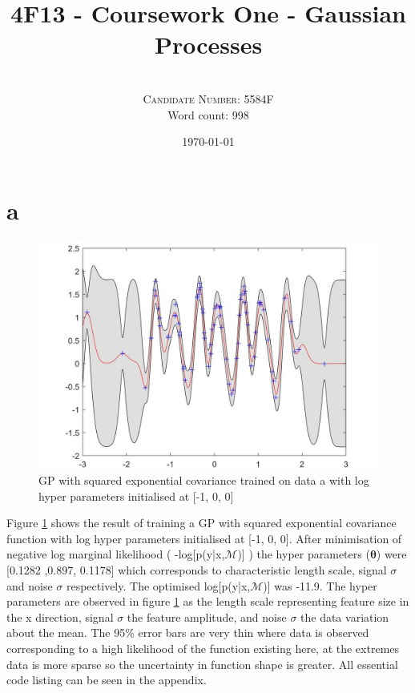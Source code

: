 \documentclass[twoside,twocolumn]{article}
\title{4F13 - Coursework One - Gaussian Processes } %
\author{%
\\
\textsc{Candidate Number: 5584F} \\
\normalsize Word count: 998 \\
}
\date{\today} %
\begin{document}
\onecolumn

\twocolumn
\maketitle



\section{a}
\begin{figure}[h]
  \centering
    \includegraphics[width=\linewidth]{c_1_1}
  \caption{GP with squared exponential covariance trained on data a with log hyper parameters initialised at [-1, 0, 0]}
  \label{fig:c_1}
\end{figure}
Figure \ref{fig:c_1} shows the result of training a GP with squared exponential covariance function with log hyper parameters initialised at [-1, 0, 0]. After minimisation of negative log marginal likelihood ( -log[p(y|x,$\mathcal{M}$)] ) the hyper parameters ($\boldsymbol{\theta}$) were [0.1282 ,0.897, 0.1178] which corresponds to characteristic length scale, signal $\sigma$ and noise $\sigma$ respectively. The optimised log[p(y|x,$\mathcal{M}$)] was -11.9. The hyper parameters are observed in figure \ref{fig:c_1} as the length scale representing feature size in the x direction, signal $\sigma$ the feature amplitude, and noise $\sigma$ the data variation about the mean. The 95\% error bars are very thin where data is observed corresponding to a high likelihood of the function existing here, at the extremes data is more sparse so the uncertainty in function shape is greater.
\newline
All essential code listing can be seen in the appendix.
\end{document}
